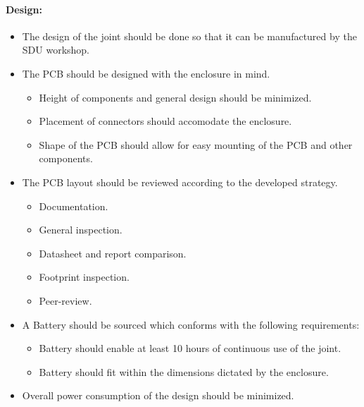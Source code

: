 \paragraph{Design:}
\begin{itemize}
	\item The design of the joint should be done so that it can be manufactured by the SDU workshop.
	\item The PCB should be designed with the enclosure in mind.
	\begin{itemize}
		\item Height of components and general design should be minimized.
		\item Placement of connectors should accomodate the enclosure.
		\item Shape of the PCB should allow for easy mounting of the PCB and other components.
	\end{itemize}
	\item The PCB layout should be reviewed according to the developed strategy.
	\begin{itemize}
		\item Documentation.
		\item General inspection.
		\item Datasheet and report comparison.
		\item Footprint inspection.
		\item Peer-review.
	\end{itemize}
	\item A Battery should be sourced which conforms with the following requirements:
	\begin{itemize}
		\item Battery should enable at least 10 hours of continuous use of the joint.
		\item Battery should fit within the dimensions dictated by the enclosure.
	\end{itemize}
	\item Overall power consumption of the design should be minimized.
\end{itemize}

